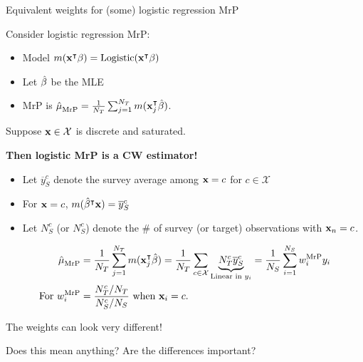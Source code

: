 \begin{frame}[t]{Equivalent weights for (some) logistic regression MrP}

Consider logistic regression MrP:
%
\begin{itemize}
    \item Model $m(\mathbf{x}^\intercal \beta) = \mathrm{Logistic}(\mathbf{x}^\intercal \beta)$
    \item Let $\hat{\beta}$ be the MLE
    \item MrP is $\hat{\mu}^{}_{\mathrm{MrP}} = \frac{1}{{N_T}} \sum_{j=1}^{N_T} m(\mathbf{x}_j^\intercal \hat{\beta})$.
\end{itemize}
%
Suppose $\mathbf{x} \in \mathcal{X}$ is discrete and saturated.

\textbf{Then logistic MrP is a CW estimator!}

\def\ybar{\overline{y}}
\def\Ntarc{N_T^c}
\def\Nsurc{N_S^c}
%
\begin{itemize}
    \item Let $\ybar_S^c$ denote the survey average among $\mathbf{x} = c$ for $c \in \mathcal{X}$
    \item For $\mathbf{x} = c$, $m(\betahat^\trans \x) = \ybar_S^c$
    \item Let $\Nsurc$ (or $\Nsurc$) denote the \# of survey (or target) observations with $\mathbf{x}_n = c$.
\end{itemize}
%
$$
\begin{aligned}
\muhat_\mrp ={}& \meantar \m(\x_j^\trans \betahat)
            = \frac{1}{\Ntar} \sum_{c \in \mathcal{X}}
            \underbrace{\Ntarc \ybar_S^c}_{\textrm{Linear in }\y_i}
        = \meansur \w_i^\mrp \y_i
\\ \textrm{For }
\w_i^\mrp ={}&
    \frac{\Ntarc / \Ntar}{\Nsurc / \Nsur} \textrm{ when }\x_i=c.
\end{aligned}
$$


\end{frame}


\begin{frame}{The weights can look very different!}

    \centering
    Does this mean anything?  Are the differences important?

    \WeightPlot{}
\end{frame}


